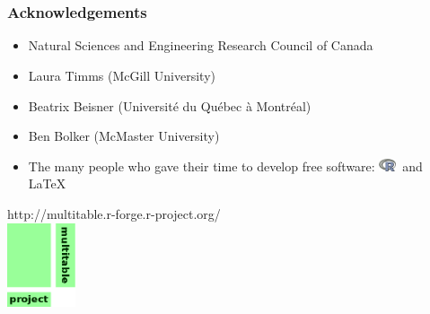 \documentclass{beamer}
\numberwithin{exercise}{section}
\newcommand{\R}{\includegraphics[width=0.5cm]{Rlogo}}
\begin{document}

\section{}

\begin{frame}
\begin{center}
\frametitle{Acknowledgements}
\vspace{-1cm}
\begin{itemize}
\item Natural Sciences and Engineering Research Council of Canada
\item Laura Timms (McGill University)
\item Beatrix Beisner (Universit\'{e} du Qu\'{e}bec \`{a} Montr\'{e}al)
\item Ben Bolker (McMaster University)
\item The many people who gave their time to develop free software: \R\ and \LaTeX\
\end{itemize}
\end{center}
http://multitable.r-forge.r-project.org/ \\
\vspace{0.3cm}
\includegraphics[width=2cm]{multitablelogo}
\end{frame}
\end{document}
